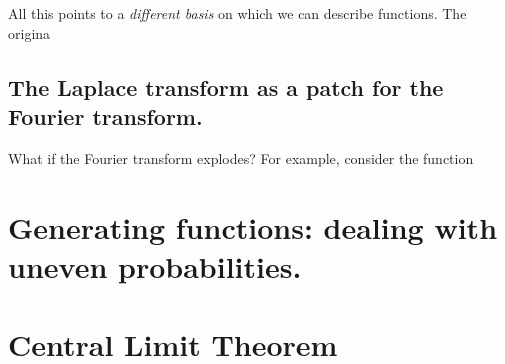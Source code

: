 \documentclass[letterpaper,12pt]{report}
\begin{document}
All this points to a \emph{different basis} on which we can describe functions.
The origina







\subsection{The Laplace transform as a patch for the Fourier transform.}

What if the Fourier transform explodes?
For example, consider the function




\section{Generating functions: dealing with uneven probabilities.}\label{sec:generating-functions} %














\section{Central Limit Theorem} %
\end{document}
